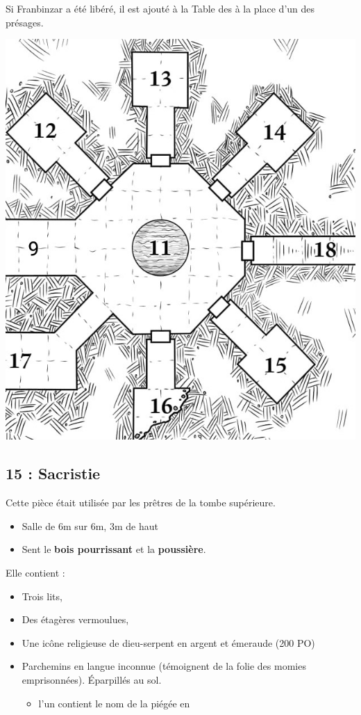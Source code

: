 Si Franbinzar a été libéré, il est ajouté à la Table des \textbf{} à la place d'un des présages.

\vfill\columnbreak

\includegraphics[width=\linewidth]{pics/map_11-18.jpg}

\subsection{15 : Sacristie}\label{n2:s15}
Cette pièce était utilisée par les prêtres de la tombe supérieure.
\begin{itemize}
  \item Salle de 6m sur 6m, 3m de haut
  \item Sent le \textbf{bois pourrissant} et la \textbf{poussière}.
\end{itemize}
Elle contient :
\begin{itemize}
    \item Trois lits,
    \item Des étagères vermoulues,
    \item Une icône religieuse de dieu-serpent en argent et émeraude (200 PO)
    \item Parchemins en langue inconnue (témoignent de la folie des momies emprisonnées).
          Éparpillés au sol.
          \begin{itemize}
            \item l'un contient le nom de la \textbf{} piégée en \textbf{}
          \end{itemize}
\end{itemize}

